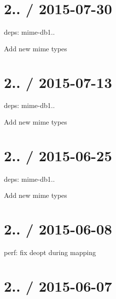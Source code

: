 \section*{2.. / 2015-\/07-\/30 }


\begin{DoxyItemize}
\item deps\+: mime-\/db1..
\begin{DoxyItemize}
\item Add new mime types
\end{DoxyItemize}
\end{DoxyItemize}

\section*{2.. / 2015-\/07-\/13 }


\begin{DoxyItemize}
\item deps\+: mime-\/db1..
\begin{DoxyItemize}
\item Add new mime types
\end{DoxyItemize}
\end{DoxyItemize}

\section*{2.. / 2015-\/06-\/25 }


\begin{DoxyItemize}
\item deps\+: mime-\/db1..
\begin{DoxyItemize}
\item Add new mime types
\end{DoxyItemize}
\end{DoxyItemize}

\section*{2.. / 2015-\/06-\/08 }


\begin{DoxyItemize}
\item perf\+: fix deopt during mapping
\end{DoxyItemize}

\section*{2.. / 2015-\/06-\/07 }


